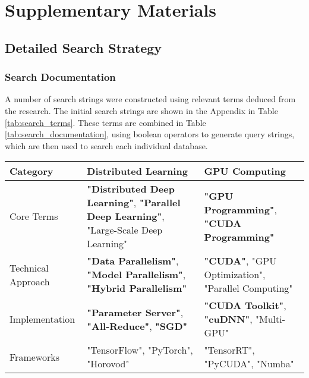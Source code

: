\clearpage
\setcounter{page}{1}
\maketitlesupplementary

\section{Supplementary Materials}
\label{sec:supplementary}

\subsection{Detailed Search Strategy}
\label{sec:search_strategy}

\subsubsection{Search Documentation}


A number of search strings were constructed using relevant terms deduced from the research. The
initial search strings are shown in the Appendix in Table \ref{tab:search_terms}. These terms are
combined in Table \ref{tab:search_documentation}, using boolean operators to generate query
strings, which are then used to search each individual database.

\begin{table*}[htbp!]
    \centering
    \caption{Core Search Terms for Distributed Deep Learning and GPU Programming}
    \label{tab:search_terms}
    \begin{tabularx}{\textwidth}{|l|X|X|}
        \hline
        \textbf{Category} & \textbf{Distributed Learning} & \textbf{GPU Computing} \\
        \hline
        Core Terms & 
        \textbf{"Distributed Deep Learning"},
        \textbf{"Parallel Deep Learning"},
        "Large-Scale Deep Learning" &
        \textbf{"GPU Programming"},
        \textbf{"CUDA Programming"} \\
        \hline
        Technical Approach & 
        \textbf{"Data Parallelism"},
        \textbf{"Model Parallelism"},
        \textbf{"Hybrid Parallelism"} &
        \textbf{"CUDA"},
        "GPU Optimization",
        "Parallel Computing" \\
        \hline
        Implementation & 
        \textbf{"Parameter Server"},
        \textbf{"All-Reduce"},
        \textbf{"SGD"} &
        \textbf{"CUDA Toolkit"},
        \textbf{"cuDNN"},
        "Multi-GPU" \\
        \hline
        Frameworks & 
        "TensorFlow",
        "PyTorch",
        "Horovod" &
        "TensorRT",
        "PyCUDA",
        "Numba" \\
        \hline
    \end{tabularx}
    \caption*{Note: Bold terms indicate primary search terms that will be prioritized.}
\end{table*}

